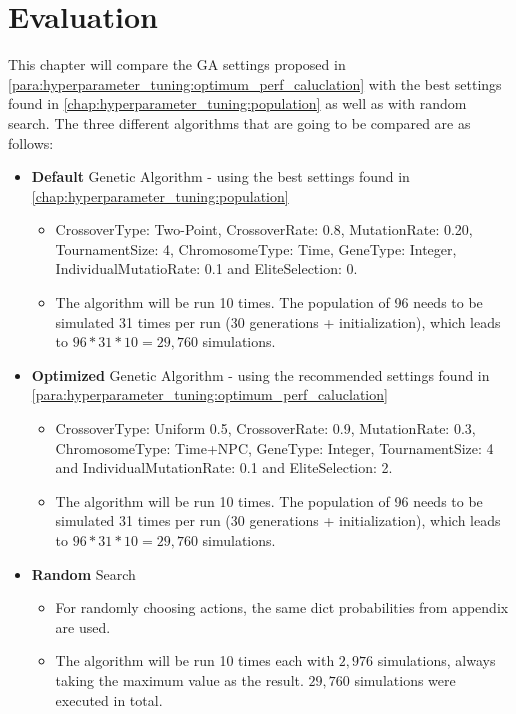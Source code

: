 \chapter{Evaluation}
\label{chap:evaluation}
This chapter will compare the GA settings proposed in \ref{para:hyperparameter_tuning:optimum_perf_caluclation} with the best settings found in \ref{chap:hyperparameter_tuning:population} as well as with random search. The three different algorithms that are going to be compared are as follows:
\begin{itemize}
	\item \textbf{Default} Genetic Algorithm - using the best settings found in \ref{chap:hyperparameter_tuning:population}
	\begin{itemize}
		\item CrossoverType: Two-Point, CrossoverRate: 0.8, MutationRate: 0.20, TournamentSize: 4, ChromosomeType: Time, GeneType: Integer, IndividualMutatioRate: 0.1 and EliteSelection: 0. 
		\item The algorithm will be run 10 times. The population of 96 needs to be simulated 31 times per run (30 generations + initialization), which leads to $96 * 31 * 10 = 29,760$ simulations.
	\end{itemize}
	\item \textbf{Optimized} Genetic Algorithm - using the recommended settings found in \ref{para:hyperparameter_tuning:optimum_perf_caluclation}
	\begin{itemize}
		\item CrossoverType: Uniform 0.5, CrossoverRate: 0.9, MutationRate: 0.3, ChromosomeType: Time+NPC, GeneType: Integer, TournamentSize: 4 and IndividualMutationRate: 0.1 and EliteSelection: 2. 
		\item The algorithm will be run 10 times. The population of 96 needs to be simulated 31 times per run (30 generations + initialization), which leads to $96 * 31 * 10 = 29,760$ simulations.
	\end{itemize}
	\item \textbf{Random} Search
	\begin{itemize}
		\item For randomly choosing actions, the same dict probabilities from  appendix are used. 
		\item The algorithm will be run 10 times each with $2,976$ simulations, always taking the maximum value as the result. $29,760$ simulations were executed in total.
	\end{itemize}
\end{itemize}


